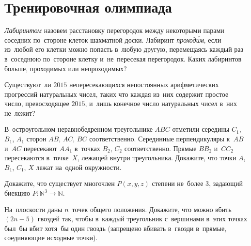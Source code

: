 
\section*{Тренировочная олимпиада}


\begin{problems}


\item
\emph{Лабиринтом} назовем расстановку перегородок между некоторыми парами
соседних по~стороне клеток шахматной доски.
Лабиринт \emph{проход\'{и}м}, если из~любой его клетки можно попасть в~любую
другую, перемещаясь каждый раз в~соседнюю по~стороне клетку и~не~пересекая
перегородок.
Каких лабиринтов больше, проходимых или непроходимых?

\item
Существуют~ли $2015$ непересекающихся непостоянных арифметических прогрессий
натуральных чисел, таких что каждая из~них содержит простое число,
превосходящее $2015$, и~лишь конечное число натуральных чисел в~них не~лежит?

\item
В~остроугольном неравнобедренном треугольнике $ABC$ отметили середины
$C_1$, $B_1$, $A_1$ сторон $AB$, $AC$, $BC$ соответственно.
Серединные перпендикуляры к~$AB$ и~$AC$ пересекают $A A_1$ в~точках
$B_2$, $C_2$ соответственно.
Прямые $B B_2$ и~$C C_2$ пересекаются в~точке~$X$, лежащей внутри треугольника.
Докажите, что точки $A$, $B_1$, $C_1$, $X$ лежат на~одной окружности.

\item
Докажите, что существует многочлен $P(x, y, z)$ степени не~более $3$, задающий
биекцию $P \colon \mathbb{N}^3 \to \mathbb{N}$.

\item
На~плоскости даны $n$~точек общего положения.
Докажите, что можно вбить $(2 n - 5)$ гвоздей так, чтобы в~каждый треугольник
с~вершинами в~этих точках был~бы вбит хотя~бы один гвоздь (запрещено вбивать
в~гвозди в~прямые, соединяющие исходные точки).

\end{problems}

